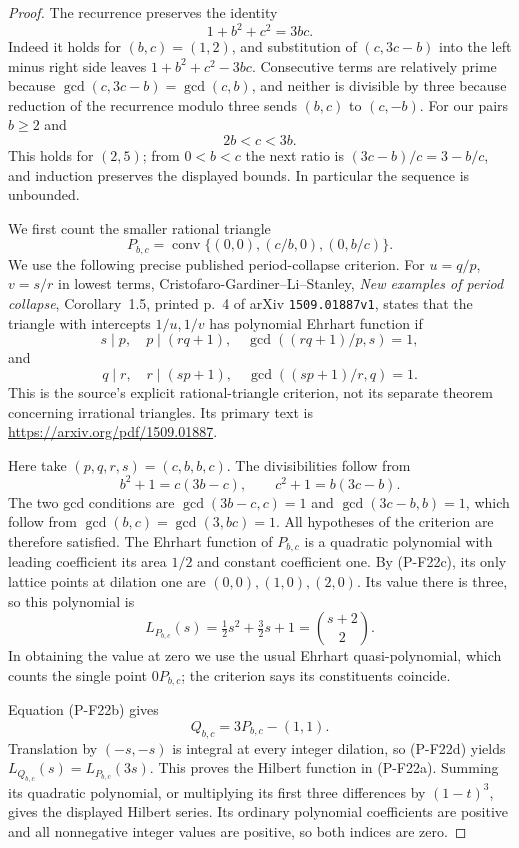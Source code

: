 \documentclass[11pt,a4paper]{article}
\begin{document}
\begin{proof}
The recurrence preserves the identity
\[
 1+b^2+c^2=3bc.
 \tag{P-F22b}
\]
Indeed it holds for $(b,c)=(1,2)$, and substitution of
$(c,3c-b)$ into the left minus right side leaves
$1+b^2+c^2-3bc$. Consecutive terms are relatively prime because
$\gcd(c,3c-b)=\gcd(c,b)$, and neither is divisible by three
because reduction of the recurrence modulo three sends
$(b,c)$ to $(c,-b)$. For our pairs $b\ge2$ and
\[
 2b<c<3b.
 \tag{P-F22c}
\]
This holds for $(2,5)$; from $0<b<c$ the next ratio is
$(3c-b)/c=3-b/c$, and induction preserves the displayed bounds.
In particular the sequence is unbounded.

We first count the smaller rational triangle
\[
 P_{b,c}=\operatorname{conv}\{(0,0),(c/b,0),(0,b/c)\}.
\]
We use the following precise published period-collapse criterion.
For $u=q/p$, $v=s/r$ in lowest terms,
Cristofaro-Gardiner--Li--Stanley, \emph{New examples of period
collapse}, Corollary~1.5, printed p.~4 of arXiv
\texttt{1509.01887v1}, states that the triangle with intercepts
$1/u,1/v$ has polynomial Ehrhart function if
\[
 s\mid p,\quad p\mid(rq+1),\quad
 \gcd((rq+1)/p,s)=1,
\]
and
\[
 q\mid r,\quad r\mid(sp+1),\quad
 \gcd((sp+1)/r,q)=1.
\]
This is the source's explicit rational-triangle criterion, not
its separate theorem concerning irrational triangles. Its primary
text is \url{https://arxiv.org/pdf/1509.01887}.

Here take $(p,q,r,s)=(c,b,b,c)$. The divisibilities follow from
\[
 b^2+1=c(3b-c),\qquad c^2+1=b(3c-b).
\]
The two gcd conditions are
$\gcd(3b-c,c)=1$ and $\gcd(3c-b,b)=1$, which follow from
$\gcd(b,c)=\gcd(3,bc)=1$. All hypotheses of the criterion are
therefore satisfied. The Ehrhart function of $P_{b,c}$ is a
quadratic polynomial with leading coefficient its area $1/2$
and constant coefficient one. By (P-F22c), its only lattice
points at dilation one are $(0,0),(1,0),(2,0)$. Its value there
is three, so this polynomial is
\[
 L_{P_{b,c}}(s)=\tfrac12s^2+\tfrac32s+1
                    =\binom{s+2}{2}.
 \tag{P-F22d}
\]
In obtaining the value at zero we use the usual Ehrhart
quasi-polynomial, which counts the single point $0P_{b,c}$;
the criterion says its constituents coincide.

Equation (P-F22b) gives
\[
 Q_{b,c}=3P_{b,c}-(1,1).
\]
Translation by $(-s,-s)$ is integral at every integer dilation,
so (P-F22d) yields $L_{Q_{b,c}}(s)=L_{P_{b,c}}(3s)$.
This proves the Hilbert function in (P-F22a). Summing its
quadratic polynomial, or multiplying its first three differences
by $(1-t)^3$, gives the displayed Hilbert series. Its ordinary
polynomial coefficients are positive and all nonnegative
integer values are positive, so both indices are zero.


\end{proof}
\end{document}

